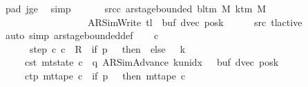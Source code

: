 \begin{isabellebody}
\ pad{}\ jge\ \isamarkupfalse%
\ simp\isanewline
\ \ \isamarkupfalse%
\isanewline
\ \ \isamarkupfalse%
\ src{\isacharunderscore}{\kern0pt}c{}{\isacharcolon}{\kern0pt}\ {\isachardoublequoteopen}ar{\isacharunderscore}{\kern0pt}stage{\isacharunderscore}{\kern0pt}bounded\ {\isacharparenleft}{\kern0pt}bl{\isacharunderscore}{\kern0pt}tm\ M{\isacharparenright}{\kern0pt}\ {\isacharparenleft}{\kern0pt}k{\isacharunderscore}{\kern0pt}tm\ M{\isacharparenright}{\kern0pt}\isanewline
\ \ \ \ \ \ \ \ \ \ \ \ \ \ \ \ \ \ {\isacharparenleft}{\kern0pt}AR{\isacharunderscore}{\kern0pt}SimWrite{\isacharcomma}{\kern0pt}\ {\isacharquery}{\kern0pt}tl{\isacharcomma}{\kern0pt}\ {}{\isacharcomma}{\kern0pt}\ buf{\isacharcomma}{\kern0pt}\ dvec{\isacharcomma}{\kern0pt}\ posk{\isacharparenright}{\kern0pt}{\isachardoublequoteclose}\isanewline
\ \ \ \ \isamarkupfalse%
\ src{}\ tl{\isacharunderscore}{\kern0pt}active\ \isamarkupfalse%
\ {\isacharparenleft}{\kern0pt}auto\ simp{\isacharcolon}{\kern0pt}\ ar{\isacharunderscore}{\kern0pt}stage{\isacharunderscore}{\kern0pt}bounded{\isacharunderscore}{\kern0pt}def{\isacharparenright}{\kern0pt}\isanewline
\ \ \isamarkupfalse%
\ c{}\ \isanewline
\ \ \ \ \ \ step{\isacharcolon}{\kern0pt}\ {\isachardoublequoteopen}{\isacharparenleft}{\kern0pt}c{}{\isacharcomma}{\kern0pt}\ c{}{\isacharparenright}{\kern0pt}\ {\isasymin}\ R{\isacharprime}{\kern0pt}\ {\isacharcircum}{\kern0pt}{\isacharcircum}{\kern0pt}\ {\isacharparenleft}{\kern0pt}if\ {\isacharquery}{\kern0pt}p\ {\isacharequal}{\kern0pt}\ {}\ then\ {}\ else\ {}\ {\isacharasterisk}{\kern0pt}\ {\isacharquery}{\kern0pt}k{\isacharparenright}{\kern0pt}{\isachardoublequoteclose}\isanewline
\ \ \ \ \ c{}{\isacharunderscore}{\kern0pt}st{\isacharcolon}{\kern0pt}\ {\isachardoublequoteopen}mt{\isacharunderscore}{\kern0pt}state\ c{}\ {\isacharequal}{\kern0pt}\ {\isacharparenleft}{\kern0pt}q{\isacharcomma}{\kern0pt}\ AR{\isacharunderscore}{\kern0pt}SimAdvance{\isacharcomma}{\kern0pt}\ k{\isacharunderscore}{\kern0pt}unidx\ {}{\isacharcomma}{\kern0pt}\ {}{\isacharcomma}{\kern0pt}\ buf{\isacharcomma}{\kern0pt}\ dvec{\isacharcomma}{\kern0pt}\ posk{\isacharparenright}{\kern0pt}{\isachardoublequoteclose}\isanewline
\ \ \ \ \ c{}{\isacharunderscore}{\kern0pt}tp{\isacharcolon}{\kern0pt}\ {\isachardoublequoteopen}mt{\isacharunderscore}{\kern0pt}tape\ c{}\ {\isacharequal}{\kern0pt}\ {\isacharparenleft}{\kern0pt}if\ {\isacharquery}{\kern0pt}p\ {\isacharequal}{\kern0pt}\ {}\ then\ mt{\isacharunderscore}{\kern0pt}tape\ c{}\isanewline

\end{isabellebody}
